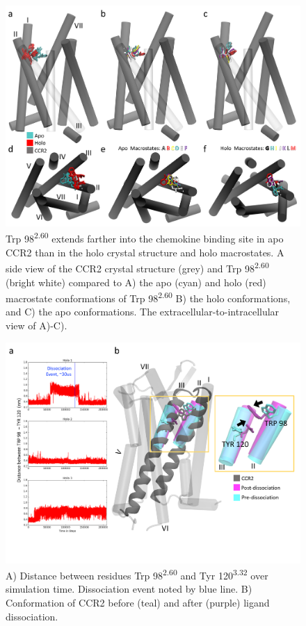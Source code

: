 \documentclass[9pt,twoside]{pnas-new}
\begin{document}
\begin{figure}
\centering
\includegraphics[width=\textwidth]{./figures/trp98_allcentroidsSI.png}
\caption{Trp 98\textsuperscript{2.60} extends farther into the chemokine binding site in apo CCR2 than in the holo crystal structure and holo macrostates. A side view of the CCR2 crystal structure (grey) and Trp 98\textsuperscript{2.60} (bright white) compared to A) the apo (cyan) and holo (red) macrostate conformations of Trp 98\textsuperscript{2.60}  B) the holo conformations, and C) the apo conformations. The extracellular-to-intracellular view of A)-C).}
\label{fig:trp98_allcentroidsSI}
\end{figure}

\begin{figure}
  \centering
  \includegraphics[width=\textwidth]{./figures/state35_98-120.png}
 \caption{A) Distance between residues Trp 98\textsuperscript{2.60} and Tyr 120\textsuperscript{3.32} over simulation time. Dissociation event noted by blue line. B) Conformation of CCR2 before (teal) and after (purple) ligand dissociation.}
  \label{fig:state35_98-120}
\end{figure}
\end{document}
